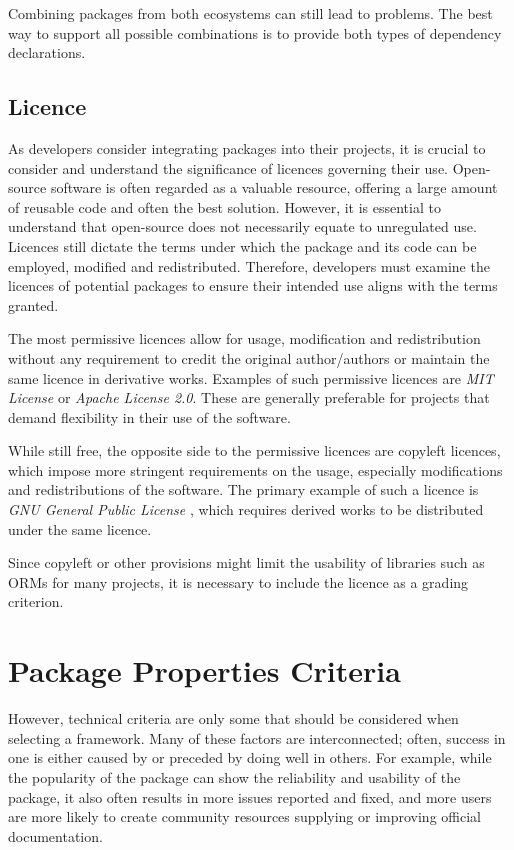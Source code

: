 Combining packages from both ecosystems can still lead to problems. The best way
to support all possible combinations is to provide both types of dependency
declarations.

\subsection{Licence}
As developers consider integrating packages into their projects, it is crucial
to consider and understand the significance of licences governing their use.
Open-source software is often regarded as a valuable resource, offering a large
amount of reusable code and often the best solution. However, it is essential to
understand that open-source does not necessarily equate to unregulated use.
Licences still dictate the terms under which the package and its code can be
employed, modified and redistributed. Therefore, developers must examine the
licences of potential packages to ensure their intended use aligns with the
terms granted.

The most permissive licences allow for usage, modification and redistribution
without any requirement to credit the original author/authors or maintain the
same licence in derivative works. Examples of such permissive licences are
\textit{MIT License}\cite{MITLicense} or \textit{Apache License
2.0}\cite{ApacheLicense2}. These are generally preferable for projects that
demand flexibility in their use of the software.

While still free, the opposite side to the permissive licences are copyleft
licences, which impose more stringent requirements on the usage, especially
modifications and redistributions of the software. The primary example of such a
licence is \textit{GNU General Public License} \cite{GNUGPL}, which requires
derived works to be distributed under the same licence.

Since copyleft or other provisions might limit the usability of libraries such
as ORMs for many projects, it is necessary to include the licence as a grading
criterion.

\section{Package Properties Criteria}

However, technical criteria are only some that should be considered when
selecting a framework. Many of these factors are interconnected; often, success
in one is either caused by or preceded by doing well in others. For example,
while the popularity of the package can show the reliability and usability of
the package, it also often results in more issues reported and fixed, and more
users are more likely to create community resources supplying or improving
official documentation.

